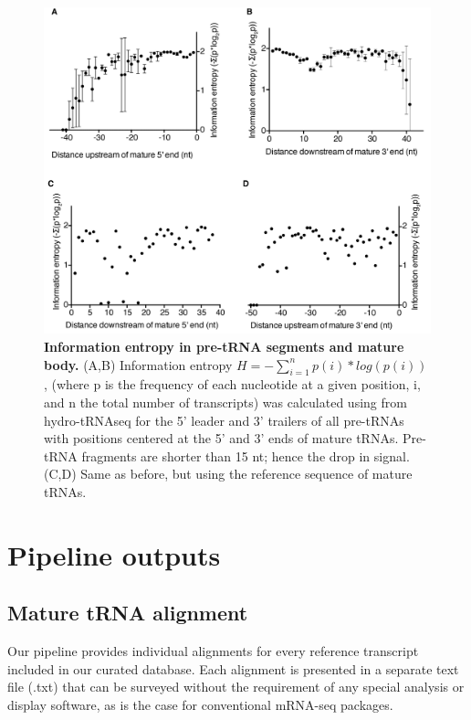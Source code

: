 \documentclass[12pt]{rockefeller}
\begin{document}
\begin{figure}[!ht]%
\centering
\includegraphics[width=\textwidth]{supp1.png}%
\caption[Information entropy in pre-tRNA segments and mature body]{\textbf{Information entropy in pre-tRNA segments and mature body.}
(A,B) Information entropy $H = -\sum_{i=1}^np(i)*log(p(i))$, (where p is the frequency of each nucleotide at a given position, i, and n the total number of transcripts) was calculated using from hydro-tRNAseq for the 5’ leader and 3’ trailers of all pre-tRNAs with positions centered at the 5’ and 3’ ends of mature tRNAs. Pre-tRNA fragments are shorter than 15 nt; hence the drop in signal. (C,D) Same as before, but using the reference sequence of mature tRNAs.}
\centering
\label{supp1}%
\end{figure}

\section{Pipeline outputs}
\subsection{Mature tRNA alignment}

Our pipeline provides individual alignments for every reference transcript included in our curated database. Each alignment is presented in a separate text file (.txt) that can be surveyed without the requirement of any special analysis or display software, as is the case for conventional mRNA-seq packages. 
\end{document}

